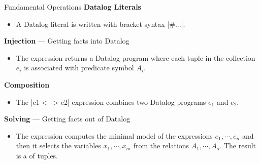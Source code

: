 \begin{frame}[fragile]{Fundamental Operations}
\textbf{Datalog Literals}
\begin{itemize}
    \small
    \item A Datalog literal is written with bracket syntax \Code|#{...}|.
\end{itemize}

\pause

\textbf{Injection} --- Getting facts into Datalog
\begin{itemize}
    \small
    \item The  expression returns a
    Datalog program where each tuple in the collection $e_i$ is associated with
    predicate symbol $A_i$.
\end{itemize}

\pause

\textbf{Composition}
\begin{itemize}
    \small
    \item The \Code|e1 <+> e2| expression combines two Datalog programs $e_1$
    and $e_2$.
\end{itemize}

\pause

\textbf{Solving} --- Getting facts out of Datalog
\begin{itemize}
    \small
    \item The 
    expression computes the minimal model of the expressions $e_1, \cdots, e_n$
    and then it selects the variables $x_1, \cdots, x_m$ from the relations
    $A_1, \cdots, A_o$. The result is a  of tuples.
\end{itemize}
\end{frame}


